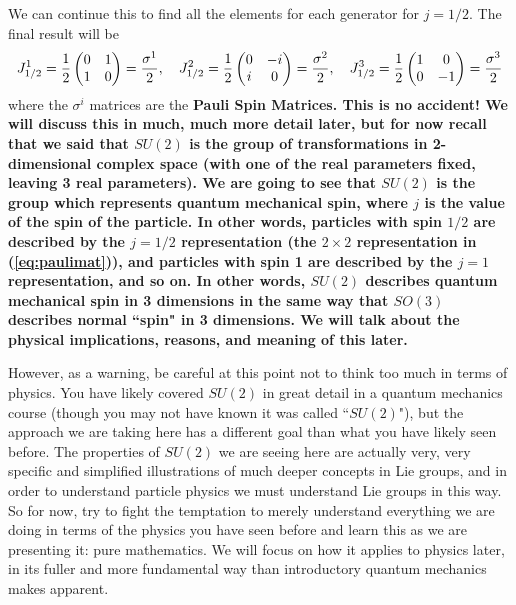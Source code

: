 \documentclass[12pt,epsf]{article}
\begin{document}
We can continue this to find all the elements for each generator for
$j=1/2$.  The final result will be
\begin{eqnarray}
J^1_{1/2} = {1\over 2}
\begin{pmatrix}
0 & 1 \\ 1 & 0
\end{pmatrix} = {\sigma^1 \over 2}, \quad 
J^2_{1/2} = {1\over 2}
\begin{pmatrix}
0 & -i \\ i & 0
\end{pmatrix} = {\sigma^2 \over 2}, \quad
J^3_{1/2} = {1\over 2}
\begin{pmatrix}
1 & 0 \\ 0 & -1
\end{pmatrix} = {\sigma^3 \over 2} \label{eq:paulimat}
\end{eqnarray}
where the $\sigma^i$ matrices are the \bf Pauli Spin Matrices\rm.  This is no
accident!  We will discuss this in much, much more detail later, but
for now recall that we said that $SU(2)$ is the group of
transformations in 2-dimensional complex space (with one of the real
parameters fixed, leaving 3 real parameters).  We are going to see
that $SU(2)$ is the group which represents quantum mechanical spin,
where $j$ is the value of the spin of the particle.  In other words,
particles with spin $1/2$ are described by the $j=1/2$ representation
(the $2\times 2$ representation in (\ref{eq:paulimat})), and particles
with spin 1 are described by the $j=1$ representation, and so on.  In
other words, $SU(2)$ describes quantum mechanical spin in 3
dimensions in the same way that $SO(3)$ describes normal ``spin" in 3
dimensions.  We will talk about the physical implications, reasons, and
meaning of this later.	

However, as a warning, be careful at this point not to think too much
in terms of physics.  You have likely covered $SU(2)$ in great detail
in a quantum mechanics course (though you may not have known it was
called ``$SU(2)$"), but the approach we are taking here has a different
goal than what you have likely seen before.  The properties of $SU(2)$
we are seeing here are actually very, very specific and simplified
illustrations of much deeper concepts in Lie groups, and in order to
understand particle physics we must understand Lie groups in this way. 
So for now, try to fight the temptation to merely understand everything
we are doing in terms of the physics you have seen before and learn
this as we are presenting it: pure mathematics.  We will focus on how
it applies to physics later, in its fuller and more fundamental way
than introductory quantum mechanics makes apparent.  
\end{document}
